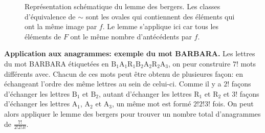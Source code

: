 \documentclass{article}
\begin{document}
\begin{question_kholle}
\begin{figure}[H]
		\caption{Représentation schématique du lemme des bergers. Les classes d'équivalence de $\sim$ sont les ovales qui contiennent des éléments qui ont la même image par $f$. Le lemme s'applique ici car tous les éléments de $F$ ont le même nombre d'antécédents par $f$.}
	\end{figure}

	\textbf{Application aux anagrammes: exemple du mot BARBARA.} Les lettres du mot BARBARA étiquetées en $\mathrm{B_{1}A_{1}R_{1}B_{2}A_{2}R_{2}A_{3}}$, on peur construire $7!$ mots différents avec. Chacun de ces mots peut être obtenu de plusieures façon: en échangeant l’ordre des même lettres au sein de celui-ci. Comme il y a $2!$ façons d’échanger les lettres $\mathrm{B_{1}}$ et $\mathrm{B_{2}}$, autant d’échanger les lettres $\mathrm{R_{1}}$ et $\mathrm{R_{2}}$ et $3!$ façons d’échanger les lettres $\mathrm{A_{1}}$, $\mathrm{A_{2}}$ et $\mathrm{A_{3}}$, un même mot est formé $2!2!3!$ fois. On peut alors appliquer le lemme des bergers pour trouver un nombre total d’anagrammes de $\frac{7!}{2!2!3!}$.
\end{question_kholle}
\end{document}
